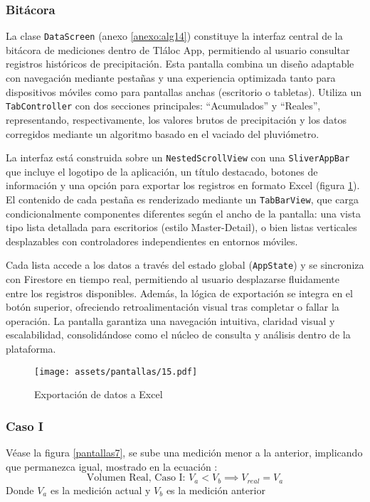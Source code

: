 \newpage
\subsubsection{Bitácora}

La clase \texttt{DataScreen}  (anexo \ref{anexo:alg14}) constituye la interfaz central de la bitácora de mediciones dentro de Tláloc App, permitiendo al usuario consultar registros históricos de precipitación. Esta pantalla combina un diseño adaptable con navegación mediante pestañas y una experiencia optimizada tanto para dispositivos móviles como para pantallas anchas (escritorio o tabletas). Utiliza un \texttt{TabController} con dos secciones principales: ``Acumulados'' y ``Reales'', representando, respectivamente, los valores brutos de precipitación y los datos corregidos mediante un algoritmo basado en el vaciado del pluviómetro.

La interfaz está construida sobre un \texttt{NestedScrollView} con una \texttt{SliverAppBar} que incluye el logotipo de la aplicación, un título destacado, botones de información y una opción para exportar los registros en formato Excel (figura \ref{pantallas15}). El contenido de cada pestaña es renderizado mediante un \texttt{TabBarView}, que carga condicionalmente componentes diferentes según el ancho de la pantalla: una vista tipo lista detallada para escritorios (estilo Master-Detail), o bien listas verticales desplazables con controladores independientes en entornos móviles.

Cada lista accede a los datos a través del estado global (\texttt{AppState}) y se sincroniza con Firestore en tiempo real, permitiendo al usuario desplazarse fluidamente entre los registros disponibles. Además, la lógica de exportación se integra en el botón superior, ofreciendo retroalimentación visual tras completar o fallar la operación. La pantalla garantiza una navegación intuitiva, claridad visual y escalabilidad, consolidándose como el núcleo de consulta y análisis dentro de la plataforma. 

\begin{figure}[h!]
\centering
  \texttt{[image: assets/pantallas/15.pdf]}
  \caption{Exportación de datos a Excel}
  \label{pantallas15}
\end{figure}


\subsubsection*{Caso I}
Véase la figura \ref{pantallas7}, se sube una medición menor a la anterior, implicando que permanezca igual, mostrado en la ecuación :
\begin{equation}
\text{Volumen Real, Caso I: } V_{a}<V_{b}\implies  V_{real} = V_{a}
\label{eq1}
\end{equation}
Donde $V_{a}$ es la medición actual y $V_{b}$ es la medición anterior

